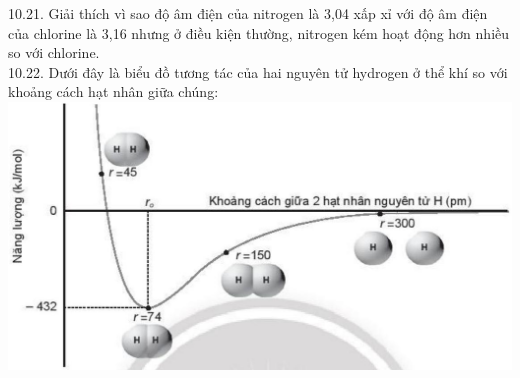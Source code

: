 \documentclass[10pt]{article}
\begin{document}
10.21. Giải thích vì sao độ âm điện của nitrogen là 3,04 xấp xỉ với độ âm điện của chlorine là 3,16 nhưng ở điều kiện thường, nitrogen kém hoạt động hơn nhiều so với chlorine.\\
10.22. Dưới đây là biểu đồ tương tác của hai nguyên tử hydrogen ở thể khí so với khoảng cách hạt nhân giữa chúng:\\
\includegraphics[max width=\textwidth, center]{2025_10_23_883c4b146e2332109fcdg-32(5)}
\end{document}
